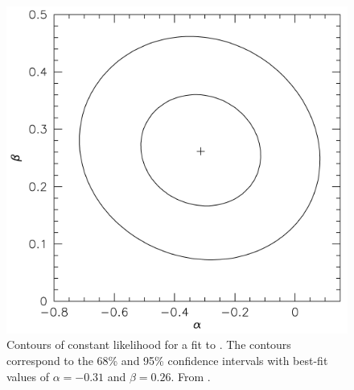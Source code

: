 \begin{figure}[ht]
\centering
\includegraphics[width=4.5in]{./figures/cummingMPfit}
 \caption[$m_P\sin I - P_{orb}$ power-law fits]{ Contours of constant likelihood for a fit to  . The contours correspond to the 68\% and 95\% confidence intervals with best-fit values of  $\alpha = -0.31$ and $\beta = 0.26$.  From \citet{cumming2008}.}
\label{fig:cummingMPfit} 
\end{figure} 


